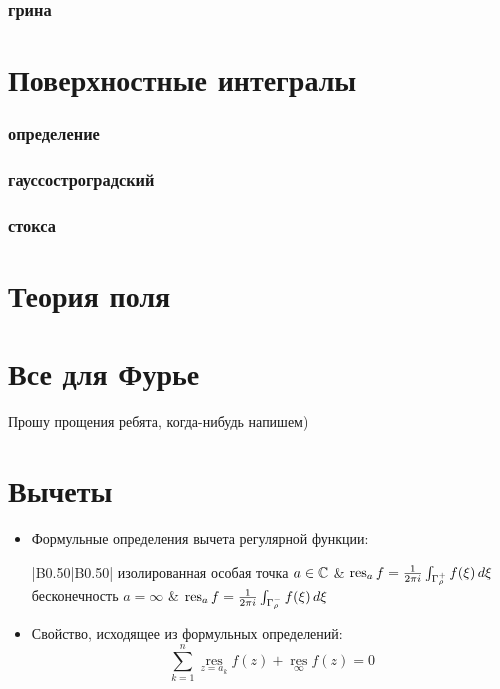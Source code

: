 \subsubsection{грина}


\section{Поверхностные интегралы}
\subsubsection{определение}
\subsubsection{гауссостроградский}
\subsubsection{стокса}

\section{Теория поля}

\section{Все для Фурье}

Прошу прощения ребята, когда-нибудь напишем)

\section{Вычеты}
\begin{itemize}
\item 
Формульные определения вычета регулярной функции:
\footnotesize
\begin{longtable}[c]{|B{0.5}{0}|B{0.5}{0}|}
\hline
изолированная особая точка $a\in\mathbb{C}$ & $\operatorname*{res}_a f=\frac{1}{2\pi i} \int_{\Gamma_{\rho}^{+}} f(\xi)\, d\xi$ \tabularnewline\hline
бесконечность $a=\infty$ &  $\operatorname*{res}_a f=\frac{1}{2\pi i} \int_{\Gamma_{\rho}^{-}} f(\xi)\, d\xi$ \tabularnewline\hline
\end{longtable}
\normalsize
\item
Свойство, исходящее из формульных определений:
$$
\sum _{k=1}^{n}\mathop {\mathrm {res} } \limits _{z=a_{k}}f(z) + \mathop {\mathrm {res}} \limits _{\infty } f(z) = 0
$$
\end{itemize}

